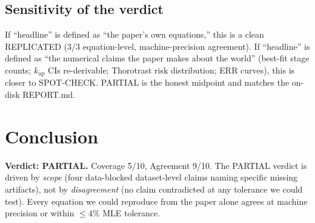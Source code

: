 \documentclass[11pt]{article}
\begin{document}
\subsection{Sensitivity of the verdict}

If ``headline'' is defined as ``the paper's own equations,'' this is a
clean REPLICATED (3/3 equation-level, machine-precision agreement). If
``headline'' is defined as ``the numerical claims the paper makes about
the world'' (best-fit stage counts; $k_{\mathrm{ap}}$ CIs re-derivable;
Thorotrast risk distribution; ERR curves), this is closer to
SPOT-CHECK. PARTIAL is the honest midpoint and matches the on-disk
REPORT.md.

\section{Conclusion}

\textbf{Verdict: PARTIAL.} Coverage 5/10, Agreement 9/10. The PARTIAL
verdict is driven by \emph{scope} (four data-blocked dataset-level
claims naming specific missing artifacts), not by \emph{disagreement}
(no claim contradicted at any tolerance we could test). Every equation
we could reproduce from the paper alone agrees at machine precision or
within $\leq 4\%$ MLE tolerance.


\end{document}
